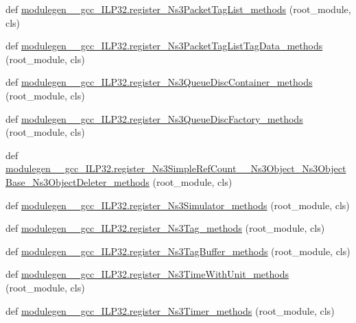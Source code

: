 \begin{DoxyCompactItemize}
\item 
def \hyperlink{namespacemodulegen____gcc__ILP32_a7f10f5444037901328380d4d5c08291a}{modulegen\+\_\+\+\_\+gcc\+\_\+\+I\+L\+P32.\+register\+\_\+\+Ns3\+Packet\+Tag\+List\+\_\+methods} (root\+\_\+module, cls)
\item 
def \hyperlink{namespacemodulegen____gcc__ILP32_aa623e91ff45aa8dce22ab35f70e26187}{modulegen\+\_\+\+\_\+gcc\+\_\+\+I\+L\+P32.\+register\+\_\+\+Ns3\+Packet\+Tag\+List\+Tag\+Data\+\_\+methods} (root\+\_\+module, cls)
\item 
def \hyperlink{namespacemodulegen____gcc__ILP32_afdc81ee4ca80476ccefd626ce59d049a}{modulegen\+\_\+\+\_\+gcc\+\_\+\+I\+L\+P32.\+register\+\_\+\+Ns3\+Queue\+Disc\+Container\+\_\+methods} (root\+\_\+module, cls)
\item 
def \hyperlink{namespacemodulegen____gcc__ILP32_aab1d077f37835d5357e0df41ee62d38e}{modulegen\+\_\+\+\_\+gcc\+\_\+\+I\+L\+P32.\+register\+\_\+\+Ns3\+Queue\+Disc\+Factory\+\_\+methods} (root\+\_\+module, cls)
\item 
def \hyperlink{namespacemodulegen____gcc__ILP32_ac5f5e4798fdbd14c15d133fdd259a2e0}{modulegen\+\_\+\+\_\+gcc\+\_\+\+I\+L\+P32.\+register\+\_\+\+Ns3\+Simple\+Ref\+Count\+\_\+\+\_\+\+Ns3\+Object\+\_\+\+Ns3\+Object\+Base\+\_\+\+Ns3\+Object\+Deleter\+\_\+methods} (root\+\_\+module, cls)
\item 
def \hyperlink{namespacemodulegen____gcc__ILP32_aa549fc85b0feec2f8115e70db4c26c2a}{modulegen\+\_\+\+\_\+gcc\+\_\+\+I\+L\+P32.\+register\+\_\+\+Ns3\+Simulator\+\_\+methods} (root\+\_\+module, cls)
\item 
def \hyperlink{namespacemodulegen____gcc__ILP32_a5578ddbed750d0c575df9ed36c4d86d6}{modulegen\+\_\+\+\_\+gcc\+\_\+\+I\+L\+P32.\+register\+\_\+\+Ns3\+Tag\+\_\+methods} (root\+\_\+module, cls)
\item 
def \hyperlink{namespacemodulegen____gcc__ILP32_a24ac4bbf908e2dfdea2eca022c057906}{modulegen\+\_\+\+\_\+gcc\+\_\+\+I\+L\+P32.\+register\+\_\+\+Ns3\+Tag\+Buffer\+\_\+methods} (root\+\_\+module, cls)
\item 
def \hyperlink{namespacemodulegen____gcc__ILP32_a8942fb893268c4774333e3a81c3cf7d3}{modulegen\+\_\+\+\_\+gcc\+\_\+\+I\+L\+P32.\+register\+\_\+\+Ns3\+Time\+With\+Unit\+\_\+methods} (root\+\_\+module, cls)
\item 
def \hyperlink{namespacemodulegen____gcc__ILP32_a4fea7315551ea1db4452a58f6e841d7c}{modulegen\+\_\+\+\_\+gcc\+\_\+\+I\+L\+P32.\+register\+\_\+\+Ns3\+Timer\+\_\+methods} (root\+\_\+module, cls)
\item 

\end{DoxyCompactItemize}
